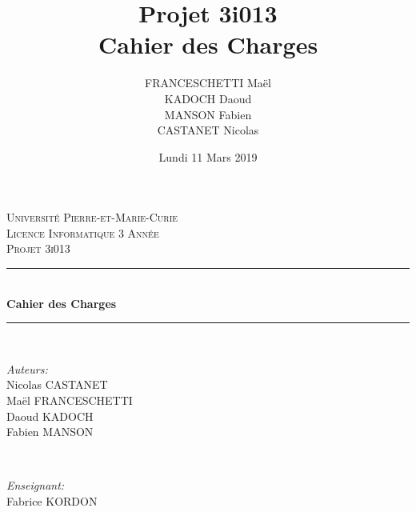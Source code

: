 \documentclass{article}
\date{Lundi 11 Mars 2019}
\author{FRANCESCHETTI Maël\\KADOCH Daoud\\MANSON Fabien\\CASTANET Nicolas}
\title{\LARGE{Projet 3i013\\}Cahier des Charges}
\begin{document}
\begin{titlepage}

\newcommand{\HRule}{\rule{\linewidth}{0.5mm}} %

\center %
 

\textsc{\LARGE Université Pierre-et-Marie-Curie}\\[3cm] %
\textsc{\Large Licence Informatique 3 Année}\\[0.5cm] %
\textsc{\large Projet 3i013}\\[2cm] %


\HRule \\[0.4cm]
{ \huge \bfseries Cahier des Charges}\\[0.4cm] %
\HRule \\[2cm]
 

\begin{minipage}{0.4\textwidth}
	\begin{flushleft} \large
	\emph{Auteurs:}\\[0.2cm]
	Nicolas \textsc{CASTANET}\\ %
	Maël \textsc{FRANCESCHETTI}\\ %
	Daoud \textsc{KADOCH}\\ %
	Fabien \textsc{MANSON} %
	\end{flushleft}
\end{minipage}
~
\begin{minipage}{0.4\textwidth}
	\begin{flushright} \large
	\emph{Enseignant:} \\[0.2cm]
	Fabrice \textsc{KORDON}
	\end{flushright}
\end{minipage}\\[4cm]


\end{titlepage}
\end{document}
